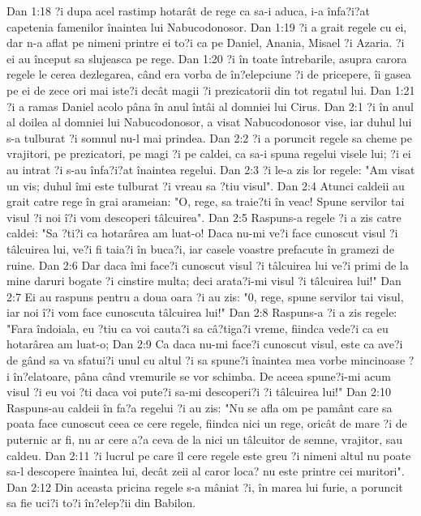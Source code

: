 Dan 1:18  ?i dupa acel rastimp hotarât de rege ca sa-i aduca, i-a înfa?i?at capetenia famenilor înaintea lui Nabucodonosor.
Dan 1:19  ?i a grait regele cu ei, dar n-a aflat pe nimeni printre ei to?i ca pe Daniel, Anania, Misael ?i Azaria. ?i ei au început sa slujeasca pe rege.
Dan 1:20  ?i în toate întrebarile, asupra carora regele le cerea dezlegarea, când era vorba de în?elepciune ?i de pricepere, îi gasea pe ei de zece ori mai iste?i decât magii ?i prezicatorii din tot regatul lui.
Dan 1:21  ?i a ramas Daniel acolo pâna în anul întâi al domniei lui Cirus.
Dan 2:1  ?i în anul al doilea al domniei lui Nabucodonosor, a visat Nabucodonosor vise, iar duhul lui s-a tulburat ?i somnul nu-l mai prindea.
Dan 2:2  ?i a poruncit regele sa cheme pe vrajitori, pe prezicatori, pe magi ?i pe caldei, ca sa-i spuna regelui visele lui; ?i ei au intrat ?i s-au înfa?i?at înaintea regelui.
Dan 2:3  ?i le-a zis lor regele: "Am visat un vis; duhul îmi este tulburat ?i vreau sa ?tiu visul".
Dan 2:4  Atunci caldeii au grait catre rege în grai arameian: "O, rege, sa traie?ti în veac! Spune servilor tai visul ?i noi î?i vom descoperi tâlcuirea".
Dan 2:5  Raspuns-a regele ?i a zis catre caldei: "Sa ?ti?i ca hotarârea am luat-o! Daca nu-mi ve?i face cunoscut visul ?i tâlcuirea lui, ve?i fi taia?i în buca?i, iar casele voastre prefacute în gramezi de ruine.
Dan 2:6  Dar daca îmi face?i cunoscut visul ?i tâlcuirea lui ve?i primi de la mine daruri bogate ?i cinstire multa; deci arata?i-mi visul ?i tâlcuirea lui!"
Dan 2:7  Ei au raspuns pentru a doua oara ?i au zis: "0, rege, spune servilor tai visul, iar noi î?i vom face cunoscuta tâlcuirea lui!"
Dan 2:8  Raspuns-a ?i a zis regele: "Fara îndoiala, eu ?tiu ca voi cauta?i sa câ?tiga?i vreme, fiindca vede?i ca eu hotarârea am luat-o;
Dan 2:9  Ca daca nu-mi face?i cunoscut visul, este ca ave?i de gând sa va sfatui?i unul cu altul ?i sa spune?i înaintea mea vorbe mincinoase ?i în?elatoare, pâna când vremurile se vor schimba. De aceea spune?i-mi acum visul ?i eu voi ?ti daca voi pute?i sa-mi descoperi?i ?i tâlcuirea lui!"
Dan 2:10  Raspuns-au caldeii în fa?a regelui ?i au zis: "Nu se afla om pe pamânt care sa poata face cunoscut ceea ce cere regele, fiindca nici un rege, oricât de mare ?i de puternic ar fi, nu ar cere a?a ceva de la nici un tâlcuitor de semne, vrajitor, sau caldeu.
Dan 2:11  ?i lucrul pe care îl cere regele este greu ?i nimeni altul nu poate sa-l descopere înaintea lui, decât zeii al caror loca? nu este printre cei muritori".
Dan 2:12  Din aceasta pricina regele s-a mâniat ?i, în marea lui furie, a poruncit sa fie uci?i to?i în?elep?ii din Babilon.
